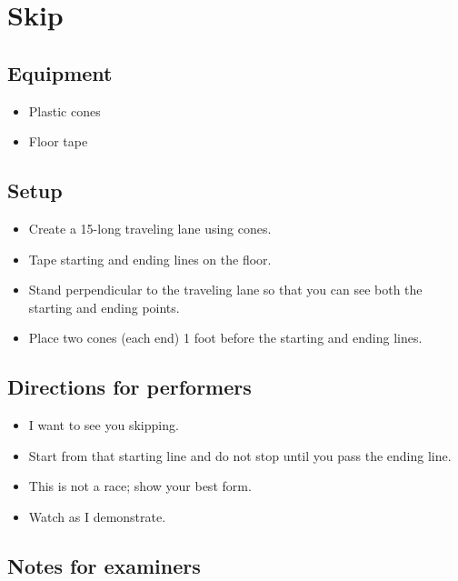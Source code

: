 \documentclass[
  letterpaper,
  DIV=11,
  numbers=noendperiod]{scrreprt}
\providecommand{\tightlist}{%
  \setlength{\itemsep}{0pt}\setlength{\parskip}{0pt}}
\begin{document}
\section{Skip}\label{skip}

\subsection{Equipment}\label{equipment-8}

\begin{itemize}
\tightlist
\item
  Plastic cones
\item
  Floor tape
\end{itemize}

\subsection{Setup}\label{setup-7}

\begin{itemize}
\tightlist
\item
  Create a 15-long traveling lane using cones.
\item
  Tape starting and ending lines on the floor.
\item
  Stand perpendicular to the traveling lane so that you can see both the
  starting and ending points.
\item
  Place two cones (each end) 1 foot before the starting and ending
  lines.
\end{itemize}

\subsection{Directions for
performers}\label{directions-for-performers-7}

\begin{itemize}
\tightlist
\item
  I want to see you skipping.
\item
  Start from that starting line and do not stop until you pass the
  ending line.
\item
  This is not a race; show your best form.
\item
  Watch as I demonstrate.
\end{itemize}

\subsection{Notes for examiners}\label{notes-for-examiners-7}
\end{document}
